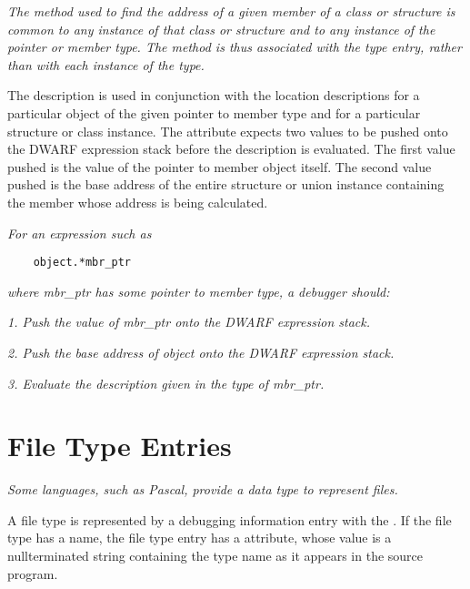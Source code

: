 \textit{The method used to find the address of a given member of a
class or structure is common to any instance of that class
or structure and to any instance of the pointer or member
type. The method is thus associated with the type entry,
rather than with each instance of the type.}

The  description is used in conjunction
with the location descriptions for a particular object of the
given pointer to member type and for a particular structure or
class instance. The  attribute expects two
values to be pushed onto the DWARF expression stack before
the  description is evaluated. The first
value pushed is the value of the pointer to member object
itself. The second value pushed is the base address of the
entire structure or union instance containing the member
whose address is being calculated.

\textit{For an expression such as}

\begin{lstlisting}
    object.*mbr_ptr
\end{lstlisting}
\textit{where mbr\_ptr has some pointer to member type, a debugger should:}

\textit{1. Push the value of mbr\_ptr onto the DWARF expression stack.}

\textit{2. Push the base address of object onto the DWARF expression stack.}

\textit{3. Evaluate the  description 
given in the type of mbr\_ptr.}

\section{File Type Entries}
\label{chap:filetypeentries}

\textit{Some languages, such as Pascal, provide a data type to represent 
files.}

A file type is represented by a debugging information entry
with the 
. 
If the file type has a name,
the file type entry has a  attribute, whose value
is a null\dash terminated string containing the type name as it
appears in the source program.

